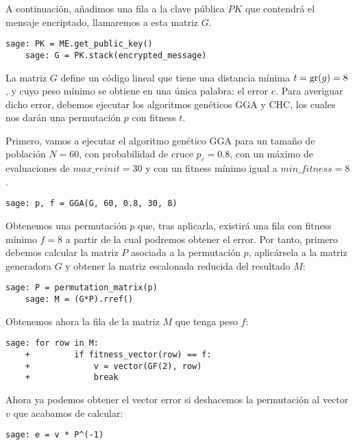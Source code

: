 \begin{exampleth}
    A continuación, añadimos una fila a la clave pública $PK$ que contendrá el mensaje encriptado, llamaremos a esta matriz $G$.

    \begin{lstlisting}[gobble=4]
    sage: PK = ME.get_public_key()
    sage: G = PK.stack(encrypted_message)
    \end{lstlisting}

    La matriz $G$ define un código lineal que tiene una distancia mínima $t = \operatorname{gr}(g) = 8$, y cuyo peso mínimo se obtiene en una única palabra: el error $e$. Para averiguar dicho error, debemos ejecutar los algoritmos genéticos GGA y CHC, los cuales nos darán una permutación $p$ con fitness $t$.

    Primero, vamos a ejecutar el algoritmo genético GGA para un tamaño de población $N = 60$, con probabilidad de cruce $p_c = 0.8$, con un máximo de evaluaciones de $max\_reinit = 30$ y con un fitness mínimo igual a $min\_fitness = 8$. 
    
    \begin{lstlisting}[gobble=4]
    sage: p, f = GGA(G, 60, 0.8, 30, 8)
    \end{lstlisting}

    Obtenemos una permutación $p$ que, tras aplicarla, existirá una fila con fitness mínimo $f = 8$ a partir de la cual podremos obtener el error. Por tanto, primero debemos calcular la matriz $P$ asociada a la permutación $p$, aplicársela a la matriz generadora $G$ y obtener la matriz escalonada reducida del resultado $M$:

    \begin{lstlisting}[gobble=4]
    sage: P = permutation_matrix(p)
    sage: M = (G*P).rref()
    \end{lstlisting}

    Obtenemos ahora la fila de la matriz $M$ que tenga peso $f$:

    \begin{lstlisting}[gobble=4]
    sage: for row in M:
    +         if fitness_vector(row) == f:
    +             v = vector(GF(2), row)
    +             break
    \end{lstlisting}
    
    Ahora ya podemos obtener el vector error si deshacemos la permutación al vector $v$ que acabamos de calcular:

    \begin{lstlisting}[gobble=4]
    sage: e = v * P^(-1)
    \end{lstlisting}


\end{exampleth}
